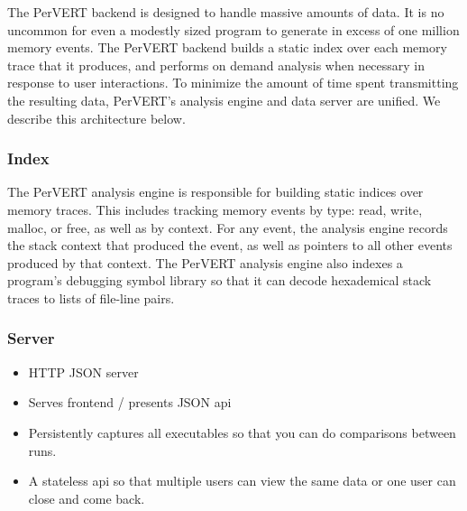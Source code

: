 \documentclass[annual]{acmsiggraph}
\begin{document}
    The PerVERT backend is designed to handle massive amounts of data.
    It is no uncommon for even a modestly sized program to generate in excess of one million memory events.
    The PerVERT backend builds a static index over each memory trace that it produces, 
      and performs on demand analysis when necessary in response to user interactions.
    To minimize the amount of time spent transmitting the resulting data, 
      PerVERT's analysis engine and data server are unified.
    We describe this architecture below.

    \subsubsection{Index}

      The PerVERT analysis engine is responsible for building static indices over memory traces.
      This includes tracking memory events by type: read, write, malloc, or free,
        as well as by context.
      For any event, the analysis engine records the stack context that produced the event, 
        as well as pointers to all other events produced by that context.       
      The PerVERT analysis engine also indexes a program's debugging symbol library so that it can decode
        hexademical stack traces to lists of file-line pairs.


    \subsubsection{Server}
      \begin{itemize}
        \item HTTP JSON server
        \item Serves frontend / presents JSON api
        \item Persistently captures all executables so that you can do comparisons between runs.
        \item A stateless api so that multiple users can view the same data or one user can close and come back.
      \end{itemize}
\end{document}
